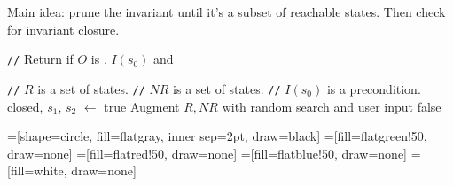 \begin{frame}
  \begin{center}
    \Huge
    Main idea: prune the invariant until it's a subset of reachable states.
    Then check for invariant closure.
  \end{center}
\end{frame}

\newcommand{\algocomment}[1]{\State \textcolor{flatdenim}{\texttt{//} #1}}

\begin{frame}
  \begin{algorithmic}
    \algocomment{Return if $O$ is \sTIconfluent{}.}
      \State
      \Return $I(s_0)$ and
    \EndFunction

    \State

    \algocomment{$R$ is a set of \sTIreachable{} states.}
    \algocomment{$NR$ is a set of \sTIunreachable{} states.}
    \algocomment{$I(s_0)$ is a precondition.}
      \State closed, $s_1$, $s_2$ $\gets$ 
        \Return true
      \EndIf
      \State Augment $R, NR$ with random search and user input
        \Return false
      \EndIf
      \State \Return {}
    \EndFunction
  \end{algorithmic}
\end{frame}

=[shape=circle, fill=flatgray, inner sep=2pt, draw=black]
=[fill=flatgreen!50, draw=none]
=[fill=flatred!50, draw=none]
=[fill=flatblue!50, draw=none]
=[fill=white, draw=none]

\newcommand{\pointgrid}[4]{{
  \newcommand{\argxmin}{#1}
  \newcommand{\argxmax}{#2}
  \newcommand{\argymin}{#3}
  \newcommand{\argymax}{#4}

  \draw[] (\argxmin, 0) to (\argxmax, 0);
  \draw[] (0, \argymin) to (0, \argymax);
  \foreach \x in {\argxmin, ..., \argxmax} {
    \foreach \y in {\argymin, ..., \argymax} {
      \node[point] (\x-\y) at (\x, \y) {};
    }
  }
}}

\newcommand{\pointrect}[2]{
  \draw[#1] ($#2 + (-0.51, 0.51)$) rectangle ($#2 + (0.51, -0.51)$);
}

\newcommand{\subfigwidth}{0.48\textwidth}
\newcommand{\subfighspace}{0.3cm}
\newcommand{\tikzhspace}{0.4cm}
\newcommand{\tikzscale}{0.5}
\newcommand{\xmin}{-3}
\newcommand{\xmax}{3}
\newcommand{\ymin}{-3}
\newcommand{\ymax}{3}

